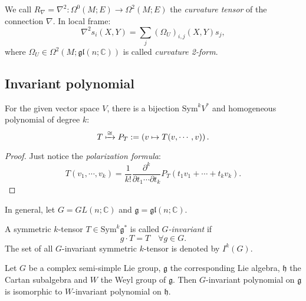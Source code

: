 \documentclass[11pt]{homework}
\theoremstyle{indented}
\begin{document}
\begin{definition}
    We call $R_\nabla = \nabla^2: \Omega^0(M;E)\to \Omega^2(M;E)$ the \textit{curvature tensor} of the connection $\nabla$. In local frame:
    \begin{equation*}
        \nabla^2 s_i (X,Y) = \sum_j \left(\Omega_U\right)_{i,j}(X, Y) s_j,
    \end{equation*}
    where $\Omega_U \in \Omega^2(M;\mathfrak{gl}(n;\mathbb{C}))$ is called \textit{curvature 2-form}.
\end{definition}

\subsection{Invariant polynomial}

\begin{proposition}
    For the given vector space $V$, there is a bijection $\mathrm{Sym}^k V^*$ and homogeneous polynomial of degree $k$:
    \begin{equation*}
        T \xmapsto{\cong} P_T := \left(v \mapsto T(v,\cdots,v)\right).
    \end{equation*}
\end{proposition}
\begin{proof}
    Just notice the \textit{polarization formula}:
    \begin{equation*}
        T(v_1, \cdots, v_k) = \frac{1}{k!}\frac{\partial^k}{\partial t_1 \cdots \partial t_k} P_T(t_1 v_1 + \cdots + t_k v_k).
    \end{equation*}
\end{proof}

In general, let $G = GL(n;\mathbb{C})$ and $\mathfrak{g} = \mathfrak{gl} (n;\mathbb{C})$.

\begin{definition}
    A symmetric $k$-tensor $T \in \mathrm{Sym}^k \mathfrak g^*$ is called \textit{$G$-invariant} if 
    \begin{equation*}
        g \cdot T = T \quad \forall g \in G.
    \end{equation*}
    The set of all $G$-invariant symmetric $k$-tensor is denoted by $I^k(G)$.
\end{definition}

\begin{theorem}
    Let $G$ be a complex semi-simple Lie group, $\mathfrak{g}$ the corresponding Lie algebra, $\mathfrak{h}$ the Cartan subalgebra and $W$ the Weyl group of $\mathfrak{g}$. 
    Then $G$-invariant polynomial on $\mathfrak{g}$ is isomorphic to $W$-invariant polynomial on $\mathfrak{h}$. 
\end{theorem}
\end{document}
